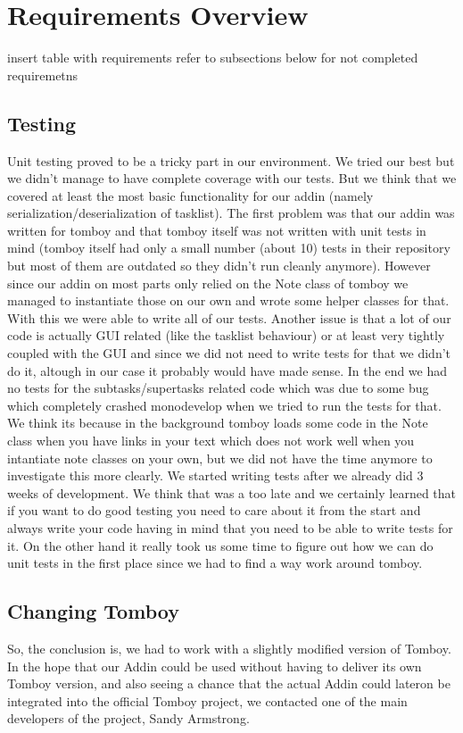 \section{Requirements Overview}
\label{requirements}
insert table with requirements refer to subsections below for not completed requiremetns

\subsection{Testing}
\label{testing}
Unit testing proved to be a tricky part in our environment. We tried our best but we didn't manage to have complete coverage with our tests. But we think that we covered at least the most basic functionality for our addin (namely serialization/deserialization of tasklist).
The first problem was that our addin was written for tomboy and that tomboy itself was not written with unit tests in mind (tomboy itself had only a small number (about 10) tests in their repository but most of them are outdated so they didn't run cleanly anymore). However since our addin on most parts only relied on the Note class of tomboy we managed to instantiate those on our own and wrote some helper classes for that. With this we were able to write all of our tests.
Another issue is that a lot of our code is actually GUI related (like the tasklist behaviour) or at least very tightly coupled with the GUI and since we did not need to write tests for that we didn't do it, altough in our case it probably would have made sense.
In the end we had no tests for the subtasks/supertasks related code which was due to some bug which completely crashed monodevelop when we tried to run the tests for that. We think its because in the background tomboy loads some code in the Note class when you have links in your text which does not work well when you intantiate note classes on your own, but we did not have the time anymore to investigate this more clearly.
We started writing tests after we already did 3 weeks of development. We think that was a too late and we certainly learned that if you want to do good testing you need to care about it from the start and always write your code having in mind that you need to be able to write tests for it. On the other hand it really took us some time to figure out how we can do unit tests in the first place since we had to find a way work around tomboy.


\subsection{Changing Tomboy}
\label{changing_tomboy}
So, the conclusion is, we had to work with a slightly modified version of Tomboy. In the hope that our Addin could be used without having to deliver its own Tomboy version, and also seeing a chance that the actual Addin could lateron be integrated into the official Tomboy project, we contacted one of the main developers of the project, Sandy Armstrong.

